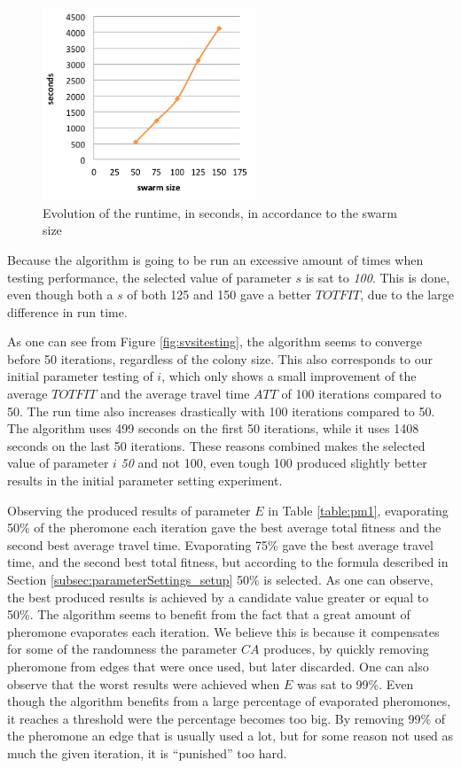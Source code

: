 \begin{figure}[H]
\begin{center}
  \includegraphics[width=2.5in]{assets/svsiruntime.png}
  \end{center}
  \caption{Evolution of the runtime, in seconds, in accordance to the swarm size}
  \label{fig:svsiruntime} 
\end{figure}

Because the algorithm is going to be run an excessive amount of times when testing performance, the selected value of parameter $s$ is sat to \textit{100}. This is done, even though both a $s$ of both 125 and 150 gave a better $TOTFIT$, due to the large difference in run time. 

As one can see from Figure \vref{fig:svsitesting}, the algorithm seems to converge before 50 iterations, regardless of the colony size. This also corresponds to our initial parameter testing of $i$, which only shows a small improvement of the average $TOTFIT$ and the average travel time $ATT$ of 100 iterations compared to 50. The run time also increases drastically with 100 iterations compared to 50. The algorithm uses 499 seconds on the first 50 iterations, while it uses 1408 seconds on the last 50 iterations. These reasons combined makes the selected value of parameter $i$ \textit{50} and not 100, even tough 100 produced slightly better results in the initial parameter setting experiment.

Observing the produced results of parameter $E$ in Table \vref{table:pm1}, evaporating 50\% of the pheromone each iteration gave the best average total fitness and the second best average travel time. Evaporating 75\% gave the best average travel time, and the second best total fitness, but according to the formula described in Section \vref{subsec:parameterSettings_setup} 50\% is selected. As one can observe, the best produced results is achieved by a candidate value greater or equal to 50\%. The algorithm seems to benefit from the fact that a great amount of pheromone evaporates each iteration. We believe this is because it compensates for some of the randomness the parameter $CA$ produces, by quickly removing pheromone from edges that were once used, but later discarded. One can also observe that the worst results were achieved when $E$ was sat to 99\%. Even though the algorithm benefits from a large percentage of evaporated pheromones, it reaches a threshold were the percentage becomes too big. By removing 99\% of the pheromone an edge that is usually used a lot, but for some reason not used as much the given iteration, it is ``punished'' too hard. 
\newline

